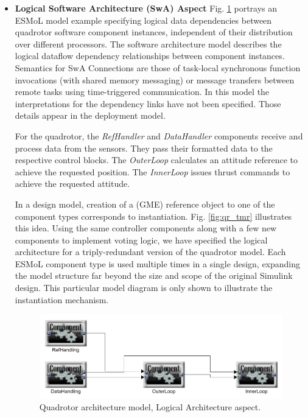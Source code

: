 \begin{itemize}

\item \textbf{Logical Software Architecture (SwA) Aspect} 
Fig. \ref{fig:qr_log_arch} portrays an ESMoL model example 
specifying logical data dependencies between 
quadrotor software component instances, 
independent of their distribution over different
processors.  The software architecture model 
describes the logical dataflow dependency relationships between component 
instances.  
Semantics for SwA Connections are those of task-local 
synchronous function invocations (with shared memory messaging)
or message transfers between remote tasks using 
time-triggered communication.  In this model the interpretations
for the dependency links have not been specified.  Those details
appear in the deployment model.

For the quadrotor, the \emph{RefHandler} and \emph{DataHandler}
components receive and process data from the sensors.  They pass
their formatted data to the respective control blocks.  The 
\emph{OuterLoop} calculates an attitude reference to achieve the
requested position.  The \emph{InnerLoop} issues thrust commands
to achieve the requested attitude.

In a design model, creation of a (GME) reference object to one of the 
component types corresponds to instantiation.
Fig. \ref{fig:qr_tmr} illustrates this idea.  Using 
the same controller components along with a few new
components to implement voting logic, we have specified 
the logical architecture for a triply-redundant
version of the quadrotor model.  Each ESMoL component
type is used multiple times in a single design, expanding 
the model structure far beyond the size and scope of the
original Simulink design.  This 
particular model diagram is only shown to 
illustrate the instantiation mechanism.

\begin{figure}
\centering
\includegraphics[width=0.8\columnwidth]{figures/quadrotor_log_arch.png}
    \caption{Quadrotor architecture model, Logical Architecture aspect.}
    \label{fig:qr_log_arch}
\end{figure}


\end{itemize}

